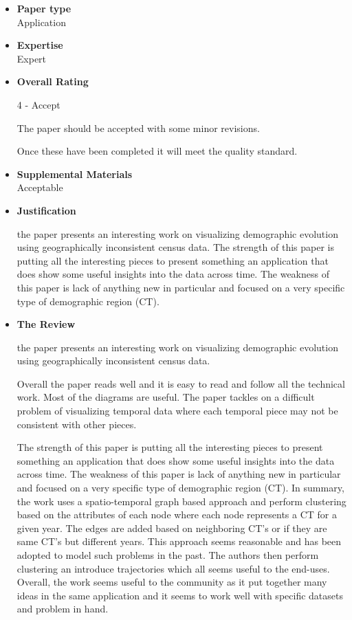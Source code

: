 \documentclass{article}
\begin{document}
\begin{itemize}
\item{\textbf{Paper type}\\Application}
\item{\textbf{Expertise}\\Expert}
\item{\textbf{Overall Rating}

    4 - Accept
    
    The paper should be accepted with some minor
    revisions.
    
    Once these have been completed it will meet the quality standard.}

\item{\textbf{Supplemental Materials}\\Acceptable}

\item{\textbf{Justification}

    the paper presents an interesting work on visualizing demographic evolution using
    geographically inconsistent census data. The strength of this paper is putting all
    the interesting pieces to present something an application that does show some
    useful insights into the data across time. The weakness of this paper is lack of
    anything new in particular and focused on a very specific type of demographic
    region (CT).
}
\item{\textbf{The Review}

    the paper presents an interesting work on visualizing demographic evolution using
    geographically inconsistent census data.

    Overall the paper reads well and it is easy to read and follow all the technical
    work. Most of the diagrams are useful. The paper tackles on a difficult problem of
    visualizing temporal data where each temporal piece may not be consistent with
    other pieces.

    The strength of this paper is putting all the interesting pieces to present
    something an application that does show some useful insights into the data across
    time. The weakness of this paper is lack of anything new in particular and focused
    on a very specific type of demographic region (CT). In summary, the work uses a
    spatio-temporal graph based approach and perform clustering based on the
    attributes of each node where each node represents a CT for a given year. The
    edges are added based on neighboring CT's or if they are same CT's but different
    years. This approach seems reasonable and has been adopted to model such problems
    in the past. The authors then perform clustering an introduce trajectories which
    all seems useful to the end-uses. Overall, the work seems useful to the community
    as it put together many ideas in the same application and it seems to work well
    with specific datasets and problem in hand.

}
\end{itemize}
\end{document}
